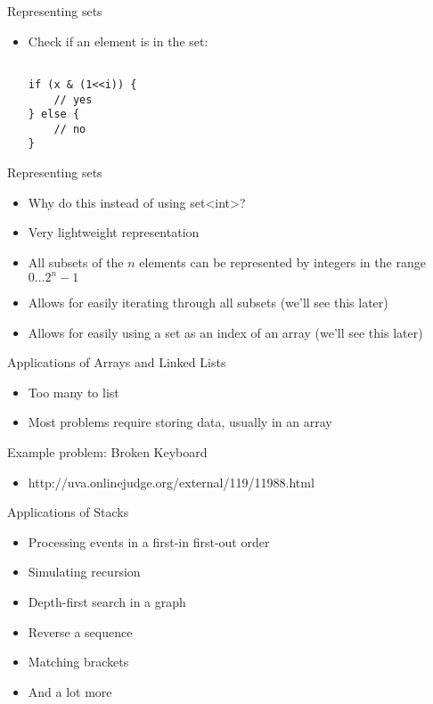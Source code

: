 \documentclass[12pt,t]{beamer}
\newcommand{\bi}{\begin{itemize}}
\newcommand{\ei}{\end{itemize}}
\begin{document}
\begin{frame}[fragile]{Representing sets}
    \vspace{25pt}
    \bi
        \item Check if an element is in the set:
            \begin{verbatim}

if (x & (1<<i)) {
    // yes
} else {
    // no
}
            \end{verbatim}
    \ei
\end{frame}

\begin{frame}{Representing sets}
    \vspace{25pt}
    \bi
        \item Why do this instead of using {\color{vhilight}set<int>}?
        \item Very lightweight representation
        \item All subsets of the $n$ elements can be represented by integers in the range $0\ldots 2^{n}-1$
        \item Allows for easily iterating through all subsets (we'll see this later)
        \item Allows for easily using a set as an index of an array (we'll see this later)
    \ei
\end{frame}

\begin{frame}{Applications of Arrays and Linked Lists}
    \vspace{40pt}
    \bi
        \item Too many to list
        \item Most problems require storing data, usually in an array
    \ei
\end{frame}

\begin{frame}{Example problem: Broken Keyboard}
    \bi
        \item http://uva.onlinejudge.org/external/119/11988.html
    \ei
\end{frame}

\begin{frame}{Applications of Stacks}
    \bi
        \item Processing events in a first-in first-out order
        \item Simulating recursion
        \item Depth-first search in a graph
        \item Reverse a sequence
        \item Matching brackets
        \item And a lot more
    \ei
\end{frame}
\end{document}
